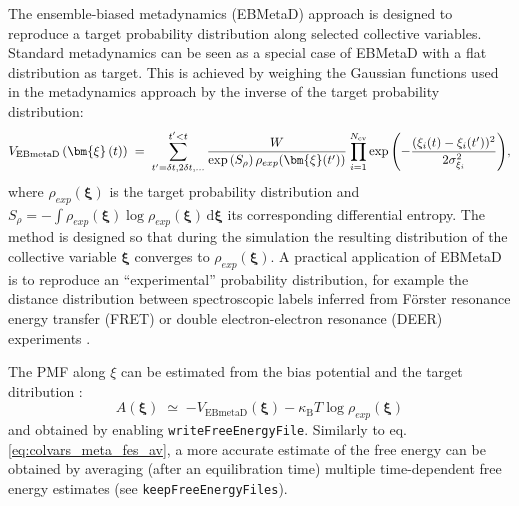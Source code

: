 The ensemble-biased metadynamics (EBMetaD) approach \cite{Marinelli2015} is designed to reproduce a target probability distribution along selected collective variables.
Standard metadynamics can be seen as a special case of EBMetaD with a flat distribution as target.
This is achieved by weighing the Gaussian functions used in the metadynamics approach by the inverse of the target probability distribution:
\begin{equation}
  \label{eq:colvars_ebmeta_pot}
  V_{\mathrm{EBmetaD}}\left(\bm{\xi}\left(t\right)\right) \; = \; {
    \sum_{t' = \delta{}t, \\ 2\delta{}t, \\ \ldots}^{t'<t} \frac{W}{\exp\left(S_{\rho}\right)\rho_{exp}(\bm{\xi}(t'))} \: {
      \prod_{i = 1}^{N_{\mathrm{cv}}}
      \exp\left(-\frac{(\xi_{i}(t)-\xi_{i}(t'))^{2}}{2\sigma_{\xi_{i}}^{2}}\right)
    }
  }\mathrm{,}
\end{equation}
where $\rho_{exp}(\bm{\xi})$ is the target probability distribution and $S_{\rho} = - \int  \rho_{exp}(\bm{\xi}) \log \rho_{exp}(\bm{\xi})  \, \mathrm{d}\bm{\xi}$ its corresponding differential entropy.
The method is designed so that during the simulation the resulting distribution of the collective variable $\bm{\xi}$ converges to $\rho_{exp}(\bm{\xi})$.
A practical application of EBMetaD is to reproduce an ``experimental'' probability distribution, for example the distance distribution between spectroscopic labels inferred from F\"orster resonance energy transfer (FRET) or double electron-electron resonance (DEER) experiments \cite{Marinelli2015}.

The PMF along $\xi$ can be estimated from the bias potential and the target ditribution \cite{Marinelli2015}:
\begin{equation}
  \label{eq:colvars_ebmeta_fes}
  A(\bm{\xi}) \; \simeq \; {
    -V_{\mathrm{EBmetaD}}(\bm{\xi}) - \kappa_{\mathrm{B}}T \log \rho_{exp}(\bm{\xi})
  }
\end{equation}
and obtained by enabling \texttt{writeFreeEnergyFile}.
Similarly to eq.{} \ref{eq:colvars_meta_fes_av}, a more accurate estimate of the free energy can be obtained by averaging (after an equilibration time) multiple time-dependent free energy estimates (see \texttt{keepFreeEnergyFiles}).

